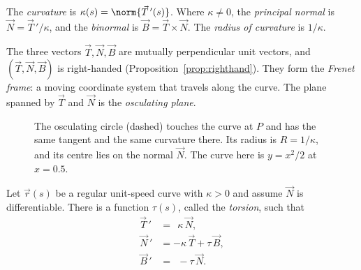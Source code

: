 \begin{definition}
The \emph{curvature} is $\kappa(s)=\norm{\vec T\,'(s)}$. Where $\kappa\ne0$, the \emph{principal normal} is $\vec N=\vec T\,'/\kappa$, and the \emph{binormal} is $\vec B=\vec T\times\vec N$. The \emph{radius of curvature} is $1/\kappa$.
\end{definition}

The three vectors $\vec T,\vec N,\vec B$ are mutually perpendicular unit vectors, and $(\vec T,\vec N,\vec B)$ is right-handed (Proposition~\ref{prop:righthand}). They form the \emph{Frenet frame}: a moving coordinate system that travels along the curve. The plane spanned by $\vec T$ and $\vec N$ is the \emph{osculating plane}.

\begin{figure}[ht]
\centering
{}
\caption{The osculating circle (dashed) touches the curve at $P$ and has the same tangent and the same curvature there. Its radius is $R=1/\kappa$, and its centre lies on the normal $\vec N$. The curve here is $y=x^2/2$ at $x=0.5$.}
\label{fig:osculating}
\end{figure}

\begin{theorem}\label{thm:frenet}
Let $\vec r(s)$ be a regular unit-speed curve with $\kappa>0$ and assume $\vec N$ is differentiable. There is a function $\tau(s)$, called the \emph{torsion}, such that
\begin{align*}
\vec T\,'&=\ \ \kappa\,\vec N,\\
\vec N\,'&=-\kappa\,\vec T+\tau\,\vec B,\\
\vec B\,'&=\ \ -\tau\,\vec N.
\end{align*}
\end{theorem}

